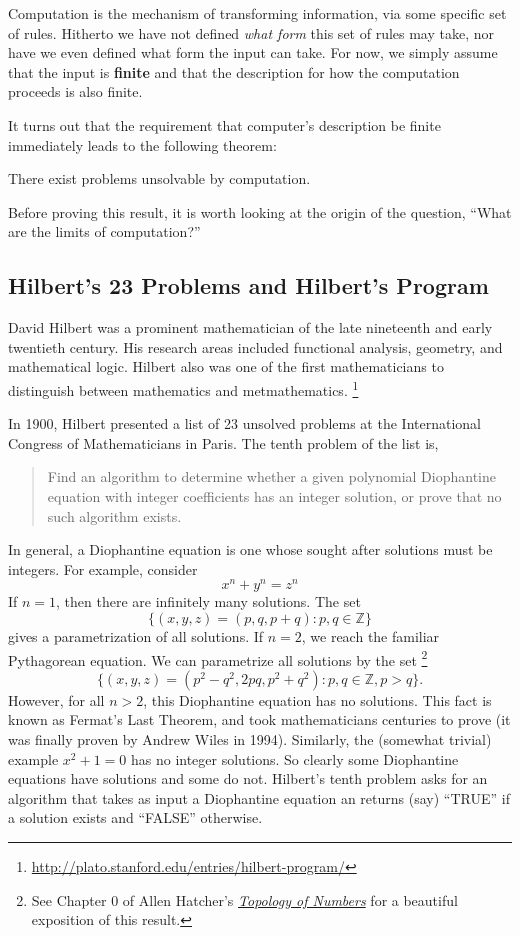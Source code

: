 \documentclass[english, 12pt]{article}
\begin{document}
  Computation is the mechanism of transforming information, via some specific
  set of rules. Hitherto we have not defined {\it what form} this set
  of rules may take, nor have we even defined what form the input can take.
  For now, we simply assume that the input is {\bf finite} and that the
  description for how the computation proceeds is also finite. \n

  It turns out that the requirement that computer's description be finite
  immediately leads to the following theorem:
  \begin{thrm} There exist problems unsolvable by computation.
  \end{thrm}
  Before proving this result, it is worth looking at the origin of the 
  question, ``What are the limits of computation?'' \n
  \subsection{Hilbert's 23 Problems and Hilbert's Program}
  David Hilbert was a prominent mathematician of the late nineteenth and
  early twentieth century. His research areas included functional analysis,
  geometry, and mathematical logic. Hilbert also was one of the first
  mathematicians to distinguish between mathematics and metmathematics.
  \footnote{\url{http://plato.stanford.edu/entries/hilbert-program/}} \n

  In 1900, Hilbert presented a list of 23 unsolved problems at the
  International Congress of Mathematicians in Paris. The tenth problem
  of the list is,
  \begin{quote}
      Find an algorithm to determine whether a given polynomial Diophantine 
      equation with integer coefficients has an integer solution, or prove
      that no such algorithm exists.
  \end{quote}
  In general, a Diophantine equation is one whose sought after solutions must
  be integers. For example, consider
  \[ x^n + y^n = z^n \]
  If $n = 1$, then there are infinitely many solutions. The set 
  \[ \{(x, y, z) = (p, q, p + q) : p, q \in \mathbb{Z}\} \] gives a
  parametrization of all solutions. If $n = 2$, we reach the familiar
  Pythagorean equation. We can parametrize all solutions by the set
  \footnote{See Chapter 0 of Allen Hatcher's {\it 
  \href{http://www.math.cornell.edu/~hatcher/TN/TNpage.html}
       {Topology of Numbers} } for a beautiful exposition of this result.}
  \[ \{ (x, y, z) = (p^2 - q^2, 2pq, p^2 + q^2) : p, q \in \mathbb{Z}, p > q
  \}. \]
  However, for all $n > 2$, this Diophantine equation has no solutions. This
  fact is known as Fermat's Last Theorem, and took mathematicians centuries
  to prove (it was finally proven by Andrew Wiles in 1994). Similarly, the
  (somewhat trivial) example \(x^2 + 1 = 0\) has no integer solutions. So 
  clearly some Diophantine equations have solutions and some do not.
  Hilbert's tenth problem asks for an algorithm that takes as input a 
  Diophantine equation an returns (say) ``TRUE'' if a solution exists and
  ``FALSE'' otherwise. \n
\end{document}
